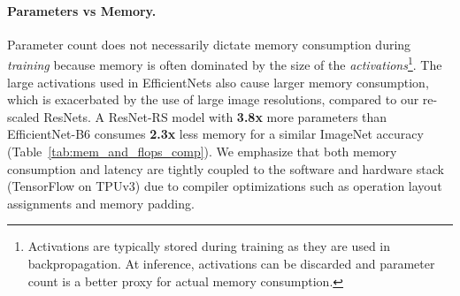 \documentclass{article}
\begin{document}
\paragraph{Parameters vs Memory.}
Parameter count does not necessarily dictate memory consumption during \emph{training} because memory is often dominated by the size of the \emph{activations}\footnote{Activations are typically stored during training as they are used in backpropagation. At inference, activations can be discarded and parameter count is a better proxy for actual memory consumption.}.
The large activations used in EfficientNets also cause larger memory consumption, which is exacerbated by the use of large image resolutions, compared to our re-scaled ResNets.
A ResNet-RS model with \textbf{3.8x} more parameters than EfficientNet-B6 consumes \textbf{2.3x} less memory for a similar ImageNet accuracy (Table~\ref{tab:mem_and_flops_comp}).
We emphasize that both memory consumption and latency are tightly coupled to the software and hardware stack (TensorFlow on TPUv3) due to compiler optimizations such as operation layout assignments and memory padding.
\end{document}
